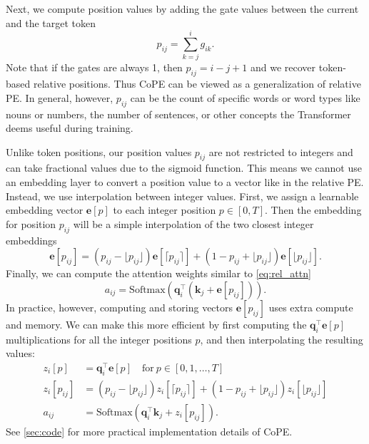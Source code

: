 \documentclass{article}
\newcommand{\ours}{CoPE\xspace}
\renewcommand{\vec}{\mathbf}
\begin{document}
Next, we compute position values by adding the gate values between the current and the target token
\begin{equation}\label{eq:position}
p_{ij} = \sum_{k=j}^{i} g_{ik} .    
\end{equation}
Note that if the gates are always 1, then $p_{ij} = i - j +1$ and we recover token-based relative positions.
Thus \ours{} can be viewed as a generalization of relative PE.
In general, however, $p_{ij}$ can be the count of specific words or word types like nouns or numbers, the number of sentences, or other concepts the Transformer deems useful during training.

Unlike token positions, our position values $p_{ij}$ are not restricted to integers and can take fractional values due to the sigmoid function. This means we cannot use an embedding layer to convert a position value to a vector like in the relative PE. Instead, we use interpolation between integer values.
First, we assign a learnable embedding vector $\vec{e}[p]$ to each integer position $p \in [0, T]$.
Then the embedding for position $p_{ij}$ will be a simple interpolation of the two closest integer embeddings
\begin{equation}
\label{eq:pos_enc}
\vec{e}[p_{ij}] = ( p_{ij} - \lfloor p_{ij} \rfloor) \vec{e}[\lceil p_{ij} \rceil ] + (1 -  p_{ij} + \lfloor p_{ij} \rfloor) \vec{e}[\lfloor p_{ij} \rfloor] .
\end{equation}
Finally, we can compute the attention weights similar to \cref{eq:rel_attn}
\begin{equation}
\label{eq:attn}
a_{ij} = \text{Softmax}(\vec{q}_i^\top (\vec{k}_j + \vec{e}[p_{ij}])) .
\end{equation}
In practice, however, computing and storing vectors $\vec{e}[p_{ij}]$ uses extra compute and memory. We can make this more efficient
by first computing the $\vec{q}_i^\top \vec{e}[p]$ multiplications for all the integer positions $p$, and then interpolating the resulting values:
\begin{align}
z_{i}[p] &= \vec{q}_i^\top \vec{e}[p] \quad \text{for} \   p \in [0, 1, \ldots, T] \label{eq:q_pos_mult} \\
z_{i}[p_{ij}] &= (p_{ij} - \lfloor p_{ij} \rfloor) z_i[\lceil p_{ij} \rceil ] + (1 - p_{ij} + \lfloor p_{ij} \rfloor) z_i[\lfloor p_{ij} \rfloor] \\
a_{ij} &= \text{Softmax}(\vec{q}_i^\top \vec{k}_j + z_{i}[p_{ij}]) .\label{eq:final_attn}
\end{align}
See \cref{sec:code} for more practical implementation details of \ours{}.
\end{document}
